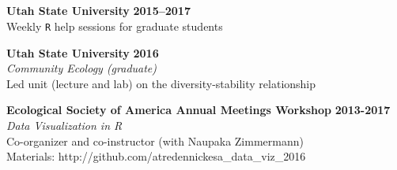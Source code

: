 \documentclass[margin,line]{resume}
\begin{document}
\begin{resume}
    
    
     \section{\textmd{\textsf{\color{MidnightBlue}{Teaching\\Experience}}}}
   
   \textbf{Utah State University} \hfill \textbf{2015--2017}\\
	Weekly \texttt{R} help sessions for graduate students
   
   \textbf{Utah State University} \hfill \textbf{2016}\\
   	\textsl{Community Ecology (graduate)} \\
	Led unit (lecture and lab) on the diversity-stability relationship
   
    \textbf{Ecological Society of America Annual Meetings Workshop} \hfill \textbf{2013-2017}\\
    		\textsl{Data Visualization in R}\\
		Co-organizer and co-instructor (with Naupaka Zimmermann)\\
		Materials: http://github.com/atredennickesa\_data\_viz\_2016
		

\end{resume}
\end{document}
